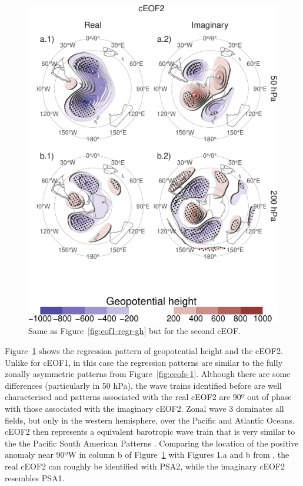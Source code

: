\documentclass[smallextended]{svjour3}       %
\begin{document}
\begin{figure}
\centering
\includegraphics{../figures/eof2-regr-gh-1.pdf}
\caption{\label{fig:eof2-regr-gh}Same as Figure~\ref{fig:eof1-regr-gh} but for the second cEOF.}
\end{figure}

Figure~\ref{fig:eof2-regr-gh} shows the regression pattern of geopotential height and the cEOF2. Unlike for cEOF1, in this case the regression patterns are similar to the fully zonally asymmetric patterns from Figure~\ref{fig:ceofs-1}. Although there are some differences (particularly in 50 hPa), the wave trains identified before are well characterised and patterns associated with the real cEOF2 are 90º out of phase with those associated with the imaginary cEOF2. Zonal wave 3 dominates all fields, but only in the western hemisphere, over the Pacific and Atlantic Oceans. cEOF2 then represents a equivalent barotropic wave train that is very similar to the the Pacific South American Patterns \citep{mo2001}. Comparing the location of the positive anomaly near 90ºW in column b of Figure~\ref{fig:eof2-regr-gh} with Figures 1.a and b from \citet{mo2001}, the real cEOF2 can roughly be identified with PSA2, while the imaginary cEOF2 resembles PSA1.
\end{document}
